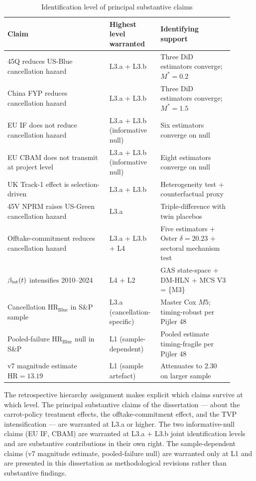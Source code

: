 \begin{table}[!htbp]
\centering
\caption{Identification level of principal substantive claims}
\label{tab:ch10-id-retrospective}
\small
\begin{tabular}{p{0.42\linewidth}p{0.18\linewidth}p{0.30\linewidth}}
\toprule
Claim & Highest level warranted & Identifying support \\
\midrule
45Q reduces US-Blue cancellation hazard & L3.a + L3.b & Three DiD estimators converge; $M^* = 0.2$ \\
China FYP reduces cancellation hazard & L3.a + L3.b & Three DiD estimators converge; $M^* = 1.5$ \\
EU IF does not reduce cancellation hazard & L3.a + L3.b (informative null) & Six estimators converge on null \\
EU CBAM does not transmit at project level & L3.a + L3.b (informative null) & Eight estimators converge on null \\
UK Track-1 effect is selection-driven & L3.a + L3.b & Heterogeneity test + counterfactual proxy \\
45V NPRM raises US-Green cancellation hazard & L3.a & Triple-difference with twin placebos \\
Offtake-commitment reduces cancellation hazard & L3.a + L3.b + L4 & Five estimators + Oster $\delta = 20.23$ + sectoral mechanism test \\
$\beta_{\mathrm{int}}(t)$ intensifies 2010--2024 & L4 + L2 & GAS state-space + DM-HLN + MCS V3 = \{M3\} \\
Cancellation HR$_{\text{Blue}}$ in S\&P sample & L3.a (cancellation-specific) & Master Cox $M5$; timing-robust per Pijler 48 \\
Pooled-failure HR$_{\text{Blue}}$ null in S\&P & L1 (sample-dependent) & Pooled estimate timing-fragile per Pijler 48 \\
v7 magnitude estimate $\text{HR} = 13.19$ & L1 (sample artefact) & Attenuates to $2.30$ on larger sample \\
\bottomrule
\end{tabular}
\end{table}

The retrospective hierarchy assignment makes explicit which claims survive at which level. The principal substantive claims of the dissertation --- about the carrot-policy treatment effects, the offtake-commitment effect, and the TVP intensification --- are warranted at L3.a or higher. The two informative-null claims (EU IF, CBAM) are warranted at L3.a + L3.b joint identification levels and are substantive contributions in their own right. The sample-dependent claims (v7 magnitude estimate, pooled-failure null) are warranted only at L1 and are presented in this dissertation as methodological revisions rather than substantive findings.

